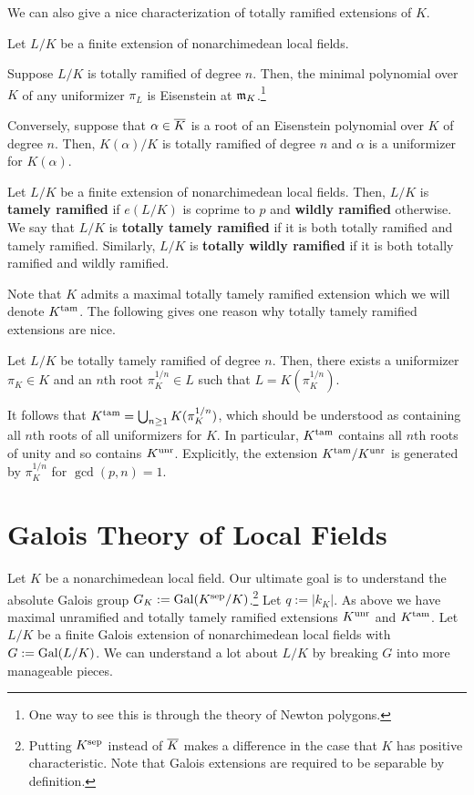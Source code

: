 \documentclass[11pt]{article}
\newcommand{\tam}{\textup{tam}} %
\begin{document}
We can also give a nice characterization of totally ramified extensions of $K$.

\begin{proposition}
Let $L/K$ be a finite extension of nonarchimedean local fields.
\begin{enum}{\alph}
\item Suppose $L/K$ is totally ramified of degree $n$. Then, the minimal polynomial over $K$ of any uniformizer $\pi_L$ is Eisenstein at $\mathfrak{m}_K$.\footnote{One way to see this is through the theory of Newton polygons.}

\item Conversely, suppose that $\alpha\in\overline{K}$ is a root of an Eisenstein polynomial over $K$ of degree $n$. Then, $K(\alpha)/K$ is totally ramified of degree $n$ and $\alpha$ is a uniformizer for $K(\alpha)$.
\end{enum}
\end{proposition}

\begin{definition}
Let $L/K$ be a finite extension of nonarchimedean local fields. Then, $L/K$ is \textbf{tamely ramified} if $e(L/K)$ is coprime to $p$ and \textbf{wildly ramified} otherwise. We say that $L/K$ is \textbf{totally tamely ramified} if it is both totally ramified and tamely ramified. Similarly, $L/K$ is \textbf{totally wildly ramified} if it is both totally ramified and wildly ramified.
\end{definition}

Note that $K$ admits a maximal totally tamely ramified extension which we will denote $K^{\tam}$. The following gives one reason why totally tamely ramified extensions are nice.

\begin{proposition}
Let $L/K$ be totally tamely ramified of degree $n$. Then, there exists a uniformizer $\pi_K\in K$ and an $n$th root $\pi_K^{1/n}\in L$ such that $L=K(\pi_K^{1/n})$.
\end{proposition}

It follows that $K^{\tam}=\bigcup_{n\geq1}K(\pi_K^{1/n})$, which should be understood as containing all $n$th roots of all uniformizers for $K$. In particular, $K^{\tam}$ contains all $n$th roots of unity and so contains $K^{\operatorname{unr}}$. Explicitly, the extension $K^{\tam}/K^{\unr}$ is generated by $\pi_K^{1/n}$ for $\gcd(p,n)=1$.

\section{Galois Theory of Local Fields}
Let $K$ be a nonarchimedean local field. Our ultimate goal is to understand the absolute Galois group $G_K:=\operatorname{Gal}(K^{\operatorname{sep}}/K)$.\footnote{Putting $K^{\operatorname{sep}}$ instead of $\overline{K}$ makes a difference in the case that $K$ has positive characteristic. Note that Galois extensions are required to be separable by definition.} Let $q:=|k_K|$. As above we have maximal unramified and totally tamely ramified extensions $K^{\operatorname{unr}}$ and $K^{\tam}$. Let $L/K$ be a finite Galois extension of nonarchimedean local fields with $G:=\operatorname{Gal}(L/K)$. We can understand a lot about $L/K$ by breaking $G$ into more manageable pieces.
\end{document}
